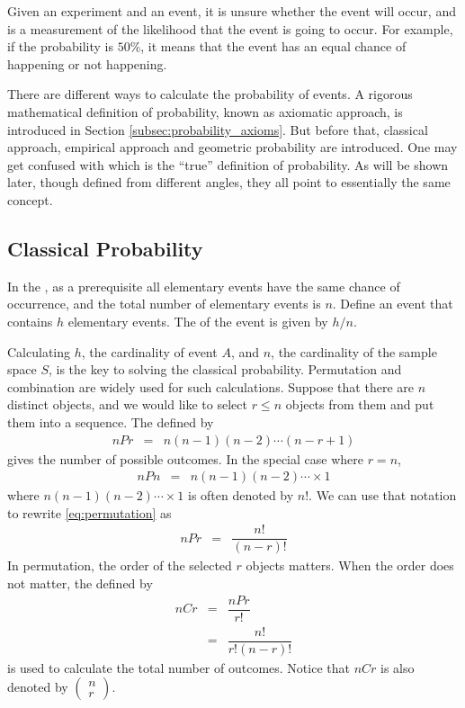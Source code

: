 Given an experiment and an event, it is unsure whether the event will occur, and  is a measurement of the likelihood that the event is going to occur. For example, if the probability is $50\%$, it means that the event has an equal chance of happening or not happening.

There are different ways to calculate the probability of events. A rigorous mathematical definition of probability, known as axiomatic approach, is introduced in Section \ref{subsec:probability_axioms}. But before that, classical approach, empirical approach and geometric probability are introduced. One may get confused with which is the ``true'' definition of probability. As will be shown later, though defined from different angles, they all point to essentially the same concept.

\subsection{Classical Probability}

In the , as a prerequisite all elementary events have the same chance of occurrence, and the total number of elementary events is $n$. Define an event that contains $h$ elementary events. The  of the event is given by $h/n$.

Calculating $h$, the cardinality of event $A$, and $n$, the cardinality of the sample space $S$, is the key to solving the classical probability. Permutation and combination are widely used for such calculations. Suppose that there are $n$ distinct objects, and we would like to select $r\leq n$ objects from them and put them into a sequence. The  defined by
\begin{eqnarray}
  nPr &=& n(n-1)(n-2)\cdots (n-r+1) \label{eq:permutation}
\end{eqnarray}
gives the number of possible outcomes. In the special case where $r=n$,
\begin{eqnarray}
  nPn &=& n(n-1)(n-2)\cdots \times 1 \nonumber
\end{eqnarray}
where $n(n-1)(n-2)\cdots \times 1$ is often denoted by $n!$. We can use that notation to rewrite \eqref{eq:permutation} as
\begin{eqnarray}
  nPr &=& \dfrac{n!}{(n-r)!} \nonumber
\end{eqnarray}
In permutation, the order of the selected $r$ objects matters. When the order does not matter, the  defined by
\begin{eqnarray}
  nCr &=& \dfrac{nPr}{r!} \nonumber \\
  &=& \dfrac{n!}{r!(n-r)!} \nonumber
\end{eqnarray}
is used to calculate the total number of outcomes. Notice that $nCr$ is also denoted by $\left(\begin{array}{c}
                                                                                           n \\
                                                                                           r
                                                                                         \end{array}\right)$.


